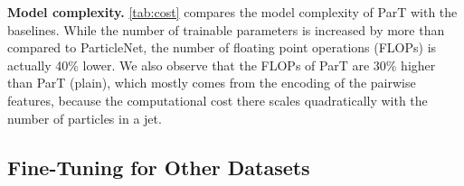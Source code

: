 \documentclass[nohyperref]{article}
\theoremstyle{plain}
\theoremstyle{definition}
\theoremstyle{remark}
\begin{document}
\textbf{Model complexity.} \cref{tab:cost} compares the model complexity of ParT with the baselines. While the number of trainable parameters is increased by more than  compared to ParticleNet, the number of floating point operations (FLOPs) is actually 40\% lower. We also observe that the FLOPs of ParT are 30\% higher than ParT (plain), which mostly comes from the encoding of the pairwise features, because the computational cost there scales quadratically with the number of particles in a jet.

\begin{table}[bt]
\caption{Number of trainable parameters and FLOPs.}
\label{tab:cost}
\vskip 0.05in
\begin{center}
\end{center}
\vskip -0.2in
\end{table}


\subsection{Fine-Tuning for Other Datasets}
\label{sec:exp-finetune}
\end{document}
